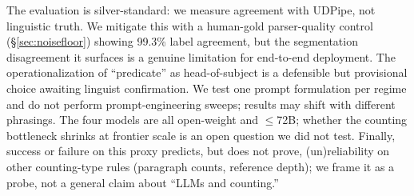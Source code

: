 \documentclass[11pt]{article}
\begin{document}
The evaluation is silver-standard: we measure agreement with UDPipe, not linguistic truth. We
mitigate this with a human-gold parser-quality control (\S\ref{sec:noisefloor}) showing 99.3\%
label agreement, but the segmentation disagreement it surfaces is a genuine limitation for
end-to-end deployment. The operationalization of ``predicate'' as head-of-subject is a defensible
but provisional choice awaiting linguist confirmation. We test one prompt formulation per regime
and do not perform prompt-engineering sweeps; results may shift with different phrasings. The four
models are all open-weight and $\leq$72B; whether the counting bottleneck shrinks at frontier
scale is an open question we did not test. Finally, success or failure on
this proxy predicts, but does not prove, (un)reliability on other counting-type rules (paragraph
counts, reference depth); we frame it as a probe, not a general claim about ``LLMs and counting.''


\end{document}
